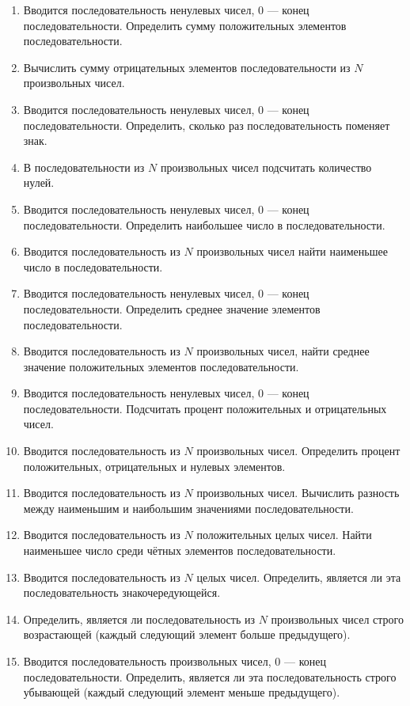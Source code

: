 \begin{enumerate}
\item Вводится последовательность ненулевых чисел, 0 --- конец последовательности. Определить сумму положительных
элементов последовательности.
\item Вычислить сумму отрицательных элементов последовательности из $N$ произвольных чисел.
\item Вводится последовательность ненулевых чисел, 0 --- конец последовательности. Определить, сколько раз
последовательность поменяет знак.
\item В последовательности из $N$ произвольных чисел подсчитать количество нулей.
\item Вводится последовательность ненулевых чисел, 0 --- конец последовательности. Определить наибольшее число в
последовательности.
\item Вводится последовательность из $N$ произвольных чисел найти наименьшее число в
последовательности.
\item Вводится последовательность ненулевых чисел, 0 --- конец последовательности. Определить среднее значение элементов
последовательности.
\item Вводится последовательность из $N$ произвольных чисел, найти среднее значение положительных
элементов последовательности.
\item Вводится последовательность ненулевых чисел, 0 --- конец последовательности. Подсчитать процент положительных и
отрицательных чисел.
\item Вводится последовательность из $N$ произвольных чисел. Определить процент положительных,
отрицательных и нулевых элементов. 
\item Вводится последовательность из $N$ произвольных чисел. Вычислить разность между наименьшим и
наибольшим значениями последовательности.
\item Вводится последовательность из $N$ положительных целых чисел. Найти наименьшее число среди
чётных элементов последовательности.
\item Вводится последовательность из $N$ целых чисел. Определить, является ли эта
последовательность знакочередующейся.
\item Определить, является ли последовательность из $N$ произвольных чисел строго возрастающей (каждый
следующий элемент больше предыдущего).
\item Вводится последовательность произвольных чисел, 0 --- конец последовательности. Определить, является ли эта
последовательность строго убывающей (каждый следующий элемент меньше предыдущего).

\end{enumerate}
